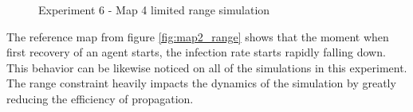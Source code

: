 \begin{figure}[H]
    \centering

    \hspace*{\fill}
    \hspace*{\fill}

    \caption{Experiment 6 - Map 4 limited range simulation}\label{fig:map4_range}
\end{figure}

The reference map from figure \ref{fig:map2_range} shows that the moment when first recovery of an agent starts, the infection rate starts rapidly falling down.
This behavior can be likewise noticed on all of the simulations in this experiment.
The range constraint heavily impacts the dynamics of the simulation by greatly reducing the efficiency of propagation.

